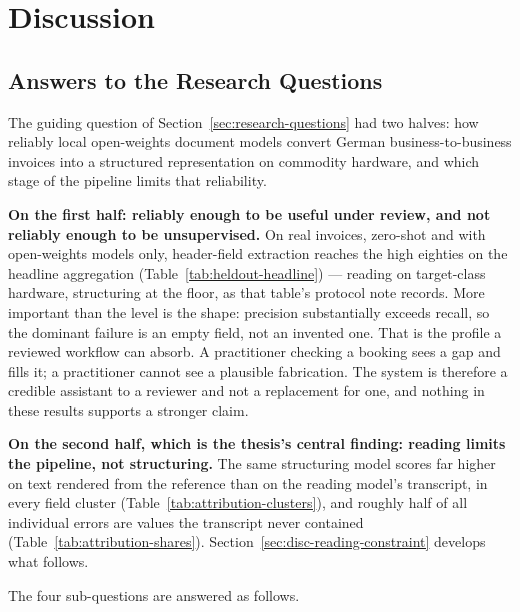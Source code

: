 \chapter{Discussion}
\label{ch:discussion}

\section{Answers to the Research Questions}
\label{sec:disc-rqs}

The guiding question of Section~\ref{sec:research-questions} had two halves: how reliably local
open-weights document models convert German business-to-business invoices into a structured
representation on commodity hardware, and which stage of the pipeline limits that reliability.

\textbf{On the first half: reliably enough to be useful under review, and not reliably enough to
be unsupervised.} On real invoices, zero-shot and with open-weights models only, header-field
extraction reaches the high eighties on the headline aggregation
(Table~\ref{tab:heldout-headline}) --- reading on target-class hardware, structuring at the
floor, as that table's protocol note records. More important than the level is the shape: precision
substantially exceeds recall, so the dominant failure is an empty field, not an invented
one. That is the profile a reviewed workflow can absorb. A practitioner checking a booking sees
a gap and fills it; a practitioner cannot see a plausible fabrication. The system is therefore
a credible assistant to a reviewer and not a replacement for one, and nothing in these results
supports a stronger claim.

\textbf{On the second half, which is the thesis's central finding: reading limits the pipeline,
not structuring.} The same structuring model scores far higher on text rendered from the
reference than on the reading model's transcript, in every field cluster
(Table~\ref{tab:attribution-clusters}), and roughly half of all individual errors are values the
transcript never contained (Table~\ref{tab:attribution-shares}). Section~\ref{sec:disc-reading-constraint}
develops what follows.

The four sub-questions are answered as follows.

